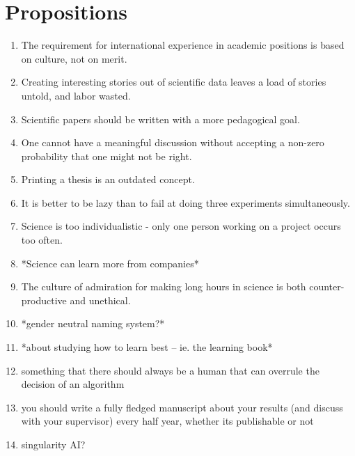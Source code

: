 



\chapter*{Propositions}

\begin{enumerate}
    \item The requirement for international experience in academic positions is based on culture, not on merit.
    \item Creating interesting stories out of scientific data leaves a load of stories untold, and labor wasted.    
    \item Scientific papers should be written with a more pedagogical goal.
    \item One cannot have a meaningful discussion without accepting a non-zero probability that one might not be right.
    \item Printing a thesis is an outdated concept.
    \item It is better to be lazy than to fail at doing three experiments simultaneously.
    \item Science is too individualistic - only one person working on a project occurs too often.
    \item *Science can learn more from companies*
    \item The culture of admiration for making long hours in science is both counter-productive and unethical.
    \item *gender neutral naming system?*
    \item *about studying how to learn best -- ie. the learning book*
    \item something that there should always be a human that can overrule the decision of an algorithm
    \item you should write a fully fledged manuscript about your results (and discuss with your supervisor) every half year, whether its publishable or not
    \item singularity AI?

\end{enumerate}
